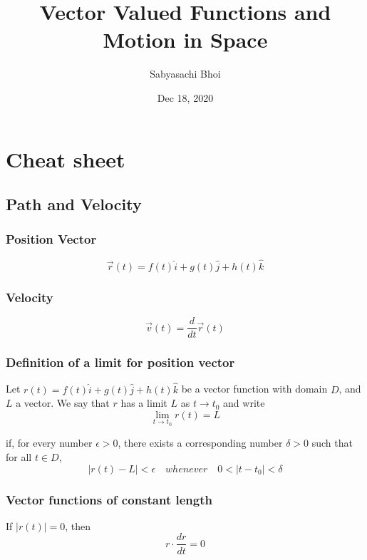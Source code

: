 \documentclass[12pt]{article}
\theoremstyle{definition}
\begin{document}
\title{Vector Valued Functions and Motion in Space}
\author{Sabyasachi Bhoi}
\date{Dec 18, 2020}
\maketitle

\section{Cheat sheet}

\subsection{Path and Velocity}
\subsubsection{Position Vector}
\begin{equation*}
	\vec{r}(t) = f(t)\hat{i} + g(t)\hat{j} + h(t)\hat{k}
\end{equation*}

\subsubsection{Velocity}
\begin{equation*}
	\vec{v}(t) = \frac{d}{dt} \vec{r}(t)
\end{equation*}

\subsubsection{Definition of a limit for position vector}
Let $r(t) = f(t)\hat{i} + g(t)\hat{j} + h(t)\hat{k}$ be a vector function with domain $D$, and $L$ a vector. We say that $r$ has a limit $L$ as $t \to t_0$ and write
\begin{equation*}
	\lim_{t \to t_0} r(t) = L 
\end{equation*}

if, for every number $\epsilon > 0$, there exists a corresponding number $\delta > 0$ such that for all $t \in D$,
\begin{equation*}
	\left| r(t) - L \right| < \epsilon \quad whenever \quad 0 < \left| t - t_0 \right| < \delta
\end{equation*}

\subsubsection{Vector functions of constant length}
If $ \left| r(t) \right| = 0$, then 
\begin{equation*}
	r \cdot \frac{dr}{dt} = 0
\end{equation*}
\end{document}
